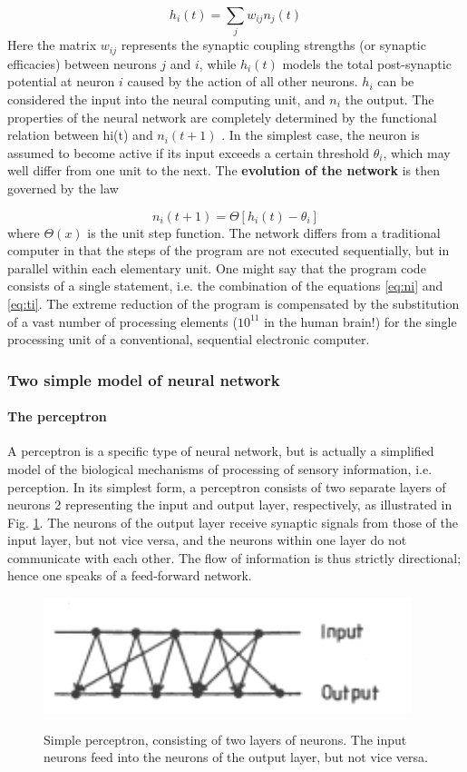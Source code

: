 \begin{equation}
    h_{i}(t) = \sum_{j} w_{ij}n_{j}(t)
    \label{eq:ti}
\end{equation}
Here the matrix $w_{ij}$ represents the synaptic coupling strengths (or synaptic
efficacies) between neurons $j$ and $i$, while $h_i(t)$ models the total post-synaptic
potential at neuron $i$ caused by the action of all other neurons.
$h_i$ can be considered the input into the neural computing unit, and $n_i$ the
output. The properties of the neural network are completely determined by
the functional relation between hi(t) and $n_i(t + 1)$ . In the simplest case, the
neuron is assumed to become active if its input exceeds a certain threshold
$\theta_i$, which may well differ from one unit to the next. The \textbf{evolution of the
network} is then governed by the law

\begin{equation}
    n_{i}(t+1)=\Theta[ h_{i}(t)-\theta_{i}]
    \label{eq:ni}
\end{equation}
where $\Theta(x)$ is the unit step function.
 The network differs from a traditional computer in that the steps of the program are not executed sequentially, but in parallel within each elementary unit. One might say that the program code consists of a single statement, i.e. the combination of the
equations \ref{eq:ni} and \ref{eq:ti}. 
The extreme reduction of the program is compensated by the substitution of a vast number of processing elements ($10^{11}$ in the human brain!) for the single processing unit of a conventional, sequential electronic computer.

\subsubsection{Two simple model of neural network}

\paragraph{The perceptron}A perceptron is a specific type of neural network, but is actually a simplified model of the biological mechanisms of processing of sensory information, i.e. perception. In its simplest form, a perceptron consists of two separate layers of neurons 2 representing the input and output layer, respectively, as illustrated in Fig. \ref{fig:Simpleperceptron}. The neurons of the output layer receive synaptic signals from those of the input layer, but not vice versa, and the neurons within one layer do not communicate with each other. The flow of information is thus strictly directional; hence one speaks of a feed-forward network.
 \begin{figure}[h!t]
\centering
{\includegraphics[width=.40\textwidth]{Immagini/SimplePerceptron.pdf}}
\caption {Simple perceptron, consisting of two layers of neurons. The input neurons feed into the neurons of the output layer, but not vice versa.}
\label{fig:Simpleperceptron}
\end{figure}

